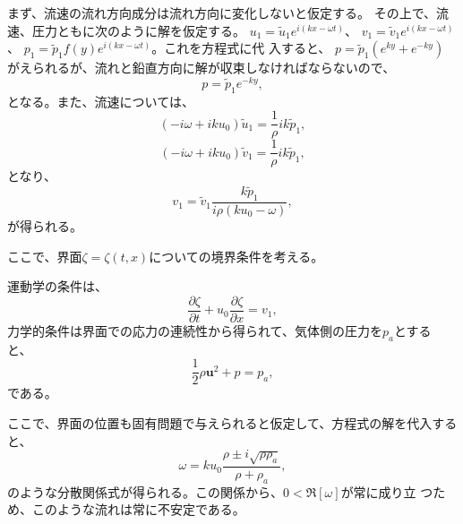 まず、流速の流れ方向成分は流れ方向に変化しないと仮定する。
その上で、流速、圧力ともに次のように解を仮定する。
$u_1=\tilde{u}_1e^{i(kx-\omega t)}$、
$v_1=\tilde{v}_1e^{i(kx-\omega t)}$、
$p_1=\tilde{p}_1f(y)e^{i(kx-\omega t)}$。これを方程式に代
入すると、
$p=\tilde{p}_1(e^{ky}+e^{-ky})$
がえられるが、流れと鉛直方向に解が収束しなければならないので、
\begin{equation}
 p=\tilde{p}_1e^{-ky},
\end{equation}
となる。また、流速については、
\begin{equation}
 (-i\omega + iku_0)\tilde{u}_1
  = \frac{1}{\rho}ik\tilde{p}_1,
\end{equation}
\begin{equation}
 (-i\omega + iku_0)\tilde{v}_1
  = \frac{1}{\rho}ik\tilde{p}_1,
\end{equation}
となり、
\begin{equation}
 v_1=\tilde{v}_1\frac{k\tilde{p}_1}{i\rho (ku_0-\omega)},
\end{equation}
が得られる。

ここで、界面$\zeta=\zeta(t,x)$についての境界条件を考える。

運動学の条件は、
\begin{equation}
 \frac{\partial\zeta}{\partial t}+u_0\frac{\partial\zeta}{\partial x} 
  = v_1,
\end{equation}
力学的条件は界面での応力の連続性から得られて、気体側の圧力を$p_a$とする
と、
\begin{equation}
 \frac{1}{2}\rho \bm{u}^2 + p = p_a,
\end{equation}
である。

ここで、界面の位置も固有問題で与えられると仮定して、方程式の解を代入すると、
\begin{equation}
 \omega =
  ku_0\frac{\rho\pm i\sqrt{\rho\rho_a}}{\rho+\rho_a},
\end{equation}
のような分散関係式が得られる。この関係から、$0<\Re[\omega]$が常に成り立
つため、このような流れは常に不安定である。

